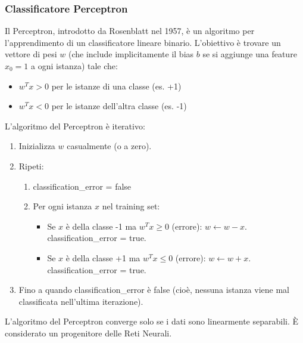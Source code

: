 \documentclass{article}
\begin{document}
\subsubsection{Classificatore Perceptron}
Il Perceptron, introdotto da Rosenblatt nel 1957, è un algoritmo per l'apprendimento di un classificatore lineare binario.  L'obiettivo è trovare un vettore di pesi $w$ (che include implicitamente il bias $b$ se si aggiunge una feature $x_0=1$ a ogni istanza) tale che:
\begin{itemize}
    \item $w^T x > 0$ per le istanze di una classe (es. +1)
    \item $w^T x < 0$ per le istanze dell'altra classe (es. -1)
\end{itemize}
L'algoritmo del Perceptron è iterativo:
\begin{enumerate}
    \item Inizializza $w$ casualmente (o a zero).
    \item Ripeti:
          \begin{enumerate}
              \item classification\_error = false
              \item Per ogni istanza $x$ nel training set:
                    \begin{itemize}
                        \item Se $x$ è della classe -1 ma $w^T x \ge 0$ (errore): $w \leftarrow w - x$.  classification\_error = true.
                        \item Se $x$ è della classe +1 ma $w^T x \le 0$ (errore): $w \leftarrow w + x$.  classification\_error = true.
                    \end{itemize}
          \end{enumerate}
    \item Fino a quando classification\_error è false (cioè, nessuna istanza viene mal classificata nell'ultima iterazione).
\end{enumerate}
L'algoritmo del Perceptron converge solo se i dati sono linearmente separabili. È considerato un progenitore delle Reti Neurali.
\end{document}
